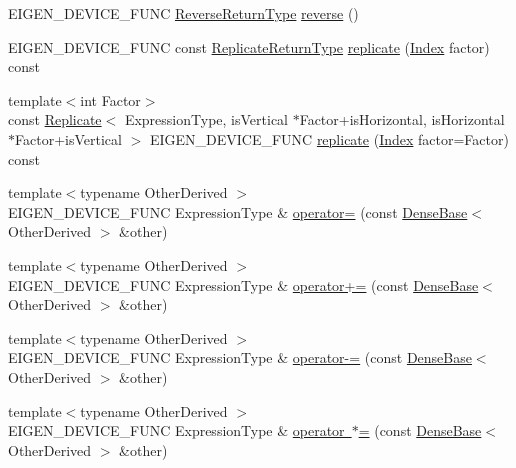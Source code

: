 \begin{DoxyCompactItemize}
\item 
E\+I\+G\+E\+N\+\_\+\+D\+E\+V\+I\+C\+E\+\_\+\+F\+U\+NC \mbox{\hyperlink{class_eigen_1_1_reverse}{Reverse\+Return\+Type}} \mbox{\hyperlink{class_eigen_1_1_vectorwise_op_a094915725d604015221205e8c4ccb993}{reverse}} ()
\item 
E\+I\+G\+E\+N\+\_\+\+D\+E\+V\+I\+C\+E\+\_\+\+F\+U\+NC const \mbox{\hyperlink{class_eigen_1_1_replicate}{Replicate\+Return\+Type}} \mbox{\hyperlink{class_eigen_1_1_vectorwise_op_a5f0c8dc9e9c4aeaa2057f15800f5c18c}{replicate}} (\mbox{\hyperlink{class_eigen_1_1_vectorwise_op_a4907c654e5810edd98e4162093b19532}{Index}} factor) const
\item 
{\footnotesize template$<$int Factor$>$ }\\const \mbox{\hyperlink{class_eigen_1_1_replicate}{Replicate}}$<$ Expression\+Type, is\+Vertical $\ast$Factor+is\+Horizontal, is\+Horizontal $\ast$Factor+is\+Vertical $>$ E\+I\+G\+E\+N\+\_\+\+D\+E\+V\+I\+C\+E\+\_\+\+F\+U\+NC \mbox{\hyperlink{class_eigen_1_1_vectorwise_op_adafbfe5f623bc8fdc9877eb073f1ba5c}{replicate}} (\mbox{\hyperlink{class_eigen_1_1_vectorwise_op_a4907c654e5810edd98e4162093b19532}{Index}} factor=Factor) const
\item 
{\footnotesize template$<$typename Other\+Derived $>$ }\\E\+I\+G\+E\+N\+\_\+\+D\+E\+V\+I\+C\+E\+\_\+\+F\+U\+NC Expression\+Type \& \mbox{\hyperlink{class_eigen_1_1_vectorwise_op_a61f54a2994758cc098671d5f0f36cfa6}{operator=}} (const \mbox{\hyperlink{class_eigen_1_1_dense_base}{Dense\+Base}}$<$ Other\+Derived $>$ \&other)
\item 
{\footnotesize template$<$typename Other\+Derived $>$ }\\E\+I\+G\+E\+N\+\_\+\+D\+E\+V\+I\+C\+E\+\_\+\+F\+U\+NC Expression\+Type \& \mbox{\hyperlink{class_eigen_1_1_vectorwise_op_ad60d01ea6717f9ef6fd7941cf8b99db7}{operator+=}} (const \mbox{\hyperlink{class_eigen_1_1_dense_base}{Dense\+Base}}$<$ Other\+Derived $>$ \&other)
\item 
{\footnotesize template$<$typename Other\+Derived $>$ }\\E\+I\+G\+E\+N\+\_\+\+D\+E\+V\+I\+C\+E\+\_\+\+F\+U\+NC Expression\+Type \& \mbox{\hyperlink{class_eigen_1_1_vectorwise_op_acf1e97639651a9b617680ba3b3ece24a}{operator-\/=}} (const \mbox{\hyperlink{class_eigen_1_1_dense_base}{Dense\+Base}}$<$ Other\+Derived $>$ \&other)
\item 
{\footnotesize template$<$typename Other\+Derived $>$ }\\E\+I\+G\+E\+N\+\_\+\+D\+E\+V\+I\+C\+E\+\_\+\+F\+U\+NC Expression\+Type \& \mbox{\hyperlink{class_eigen_1_1_vectorwise_op_ad83aa84cc84b091fc69b1baaf9cac36e}{operator $\ast$=}} (const \mbox{\hyperlink{class_eigen_1_1_dense_base}{Dense\+Base}}$<$ Other\+Derived $>$ \&other)

\end{DoxyCompactItemize}

